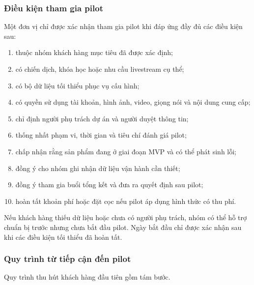 \subsubsection{Điều kiện tham gia pilot}

Một đơn vị chỉ được xác nhận tham gia pilot khi đáp ứng đầy đủ các điều kiện sau:

\begin{enumerate}
    \item thuộc nhóm khách hàng mục tiêu đã được xác định;
    \item có chiến dịch, khóa học hoặc nhu cầu livestream cụ thể;
    \item có bộ dữ liệu tối thiểu phục vụ cấu hình;
    \item có quyền sử dụng tài khoản, hình ảnh, video, giọng nói và nội dung cung cấp;
    \item chỉ định người phụ trách dự án và người duyệt thông tin;
    \item thống nhất phạm vi, thời gian và tiêu chí đánh giá pilot;
    \item chấp nhận rằng sản phẩm đang ở giai đoạn MVP và có thể phát sinh lỗi;
    \item đồng ý cho nhóm ghi nhận dữ liệu vận hành cần thiết;
    \item đồng ý tham gia buổi tổng kết và đưa ra quyết định sau pilot;
    \item hoàn tất khoản phí hoặc đặt cọc nếu pilot áp dụng hình thức có thu phí.
\end{enumerate}

Nếu khách hàng thiếu dữ liệu hoặc chưa có người phụ trách, nhóm có thể hỗ trợ chuẩn bị trước nhưng chưa bắt đầu pilot. Ngày bắt đầu chỉ được xác nhận sau khi các điều kiện tối thiểu đã hoàn tất.

\subsubsection{Quy trình từ tiếp cận đến pilot}

Quy trình thu hút khách hàng đầu tiên gồm tám bước.

